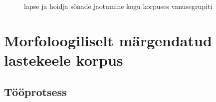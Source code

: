 \documentclass[12pt]{article}
\begin{document}
\begin{figure}[H]
    \centering
    \qquad
    \caption{lapse ja hoidja sõnade jaotumine kogu korpuses vanusegrupiti}
\end{figure}


\newpage

\section{Morfoloogiliselt märgendatud lastekeele korpus}

\subsection{Tööprotsess}
\end{document}

